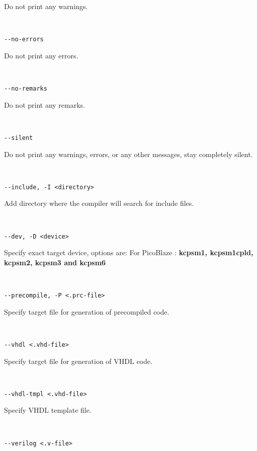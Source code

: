             Do not print any warnings.
             {
            ~\\
            \usecodefont

            \verb'--no-errors'\\
            }
            Do not print any errors.
             {
            ~\\
            \usecodefont

            \verb'--no-remarks'\\
            }
            Do not print any remarks.
             {
            ~\\
            \usecodefont

            \verb'--silent'\\
            }
            Do not print any warnings, errors, or any other messages, stay completely silent.
             {
            ~\\
            \usecodefont

            \verb'--include, -I <directory>'\\
            }
            Add directory where the compiler will search for include files.
             {
            ~\\
            \usecodefont

            \verb'--dev, -D <device>'\\
            }
            Specify exact target device, options are:
            For PicoBlaze : \textbf{kcpsm1, kcpsm1cpld, kcpsm2, kcpsm3 and kcpsm6}
            {
            ~\\
            \usecodefont

            \verb'--precompile, -P <.prc-file>'\\
            }
            Specify target file for generation of precompiled code.
             {
            ~\\
            \usecodefont

            \verb'--vhdl <.vhd-file>'\\
            }
            Specify target file for generation of VHDL code.
             {
            ~\\
            \usecodefont

            \verb'--vhdl-tmpl <.vhd-file>'\\
            }
             Specify VHDL template file.
             {
            ~\\
            \usecodefont

            \verb'--verilog <.v-file>'\\
            }
